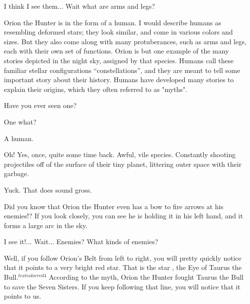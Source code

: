 \documentclass[main.tex]{subfiles}
\begin{document}
\par \Maia I think I see them... Wait what are arms and legs?  

\par \Pleione Orion the Hunter is in the form of a human.  I would describe humans as resembling deformed stars; they look similar, and come in various colors and sizes.  But they also come along with many protuberances, such as arms and legs, each with their own set of functions.   Orion is but one example of the many stories depicted in the night sky, assigned by that species.  Humans call these familiar stellar configurations ``constellations'', and they are meant to tell some important story about their history.  Humans have developed many stories to explain their origins, which they often referred to as "myths".

\par \Maia Have you ever seen one?

\par \Pleione One what?

\par \Maia A human.

\par \Pleione Oh!  Yes, once, quite some time back.  Awful, vile species.  Constantly shooting projectiles off of the surface of their tiny planet, littering outer space with their garbage.

\par \Maia Yuck.  That does sound gross.  

\par \Pleione Did you know that Orion the Hunter even has a bow to fire arrows at his enemies!?  If you look closely, you can see he is holding it in his left hand, and it forms a large arc in the sky.

\par \Maia I see it!... Wait... Enemies?  What kinds of enemies?

\par \Pleione Well, if you follow Orion's Belt from left to right, you will pretty quickly notice that it points to a very bright red star.  That is the star \rmaldebarran, the Eye of Taurus the Bull.$^{textcolor{red}{4}}$  According to the myth, Orion the Hunter fought Taurus the Bull to save the Seven Sisters.  If you keep following that line, you will notice that it points to us.
\end{document}
